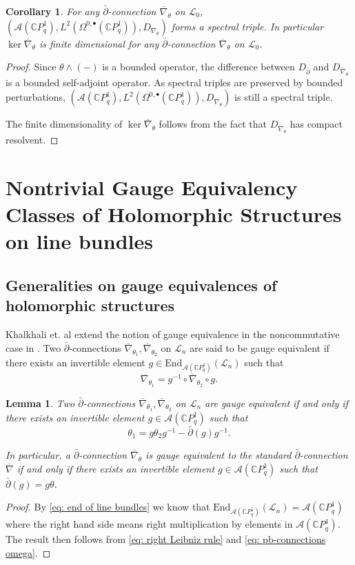 \documentclass[12pt]{article}
\newtheorem{lemma}[definition]{Lemma}
\newtheorem{corollary}[definition]{Corollary}
\numberwithin{equation}{section}
\def\End{{\mathrm {End}}}
\def\pb{\bar{\partial}}
\def\C{{\mathbb C}}
\def\A{\mathcal{A}}
\def\L{\mathcal{L}}
\begin{document}
\begin{corollary}\label{coro: any connection gives a spectral triple}
 For any $\pb$-connection $\overline{\nabla}_{\theta}$ on $\L_0$, $(\A(\C P^1_q), L^2(\Omega^{0,\bullet}(\C P^1_q)), D_{\overline{\nabla}_{\theta}})$ forms a spectral triple. In particular $\ker \overline{\nabla}_{\theta}$ is finite dimensional for any $\pb$-connection $\overline{\nabla}_{\theta}$ on $\L_0$.
\end{corollary}
\begin{proof}
    Since $\theta\wedge(-)$ is a bounded operator, the difference between $D_{\pb}$ and $D_{\overline{\nabla}_{\theta}}$ is a bounded self-adjoint operator. As spectral triples are preserved by bounded perturbations, $(\A(\C P^1_q), L^2(\Omega^{0,\bullet}(\C P^1_q)), D_{\overline{\nabla}_{\theta}})$ is still a spectral triple.

    The finite dimensionality of $\ker \overline{\nabla}_{\theta}$ follows from the fact that $D_{\overline{\nabla}_{\theta}}$ has compact resolvent.
\end{proof}




\section{Nontrivial Gauge Equivalency Classes of Holomorphic Structures on line bundles}\label{section: non standard holomorphic structures}

\subsection{Generalities on gauge equivalences of holomorphic structures}\label{subsection: gauge equivalence}
Khalkhali et. al extend the notion of gauge equivalence in the noncommutative case in \cite[Definition 2.9]{khalkhali2011holomorphic}. Two $\pb$-connections $\overline{\nabla}_{\theta_1}, \overline{\nabla}_{\theta_2}$ on  $\L_n$ are said to be gauge equivalent if there exists an invertible element $g \in \End_{\A(\C P^1_q)}(\L_n)$ such that \[
    \overline{\nabla}_{\theta_1} = g^{-1} \circ \overline{\nabla}_{\theta_2}\circ g.
\]


\begin{lemma}\label{lemma: gauge equivalence expanded}
    Two $\pb$-connections $\overline{\nabla}_{\theta_1}, \overline{\nabla}_{\theta_2}$ on  $\L_n$ are  gauge equivalent if and only if there exists an invertible element $g\in \A(\C P^1_q)$ such that
    $$
    \theta_1=g\theta_2 g^{-1}-\pb(g)g^{-1}.
    $$

    In particular, a $\pb$-connection $\overline{\nabla}_{\theta}$ is gauge equivalent to the standard $\pb$-connection $\overline{\nabla}$ if and only if there exists an invertible element $g\in \A(\C P^1_q)$ such that $\pb(g)=g\theta$.
\end{lemma}
\begin{proof}
    By \eqref{eq: end of line bundles} we know that $\End_{\A(\C P^1_q)}(\L_n)=\A(\C P^1_q)$ where the right hand side means right multiplication by elements in $\A(\C P^1_q)$. The result then follows from  \eqref{eq: right Leibniz rule} and \eqref{eq: pb-connections omega}.
\end{proof}
\end{document}
